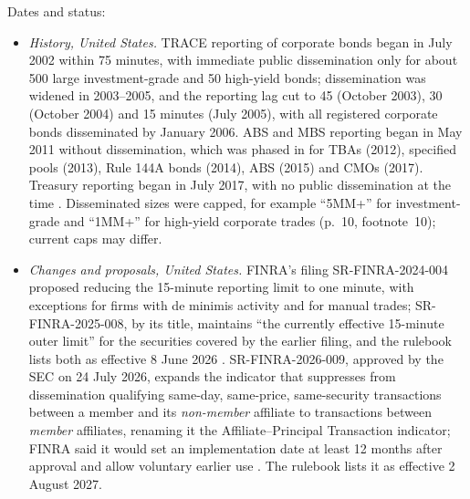 \begin{qfrule}
\begin{itemize}
\end{itemize}

 Dates and status:
\begin{itemize}
\item \emph{History, United States.} TRACE reporting of corporate bonds began in July 2002 within 75 minutes, with immediate public dissemination only for about 500 large investment-grade and 50 high-yield bonds; dissemination was widened in 2003--2005, and the reporting lag cut to 45 (October 2003), 30 (October 2004) and 15 minutes (July 2005), with all registered corporate bonds disseminated by January 2006. ABS and MBS reporting began in May 2011 without dissemination, which was phased in for TBAs (2012), specified pools (2013), Rule 144A bonds (2014), ABS (2015) and CMOs (2017). Treasury reporting began in July 2017, with no public dissemination at the time \citep[Table~2, p.~9]{wide-bsv-fi-survey}. Disseminated sizes were capped, for example ``5MM+'' for investment-grade and ``1MM+'' for high-yield corporate trades (p.~10, footnote~10); current caps may differ.
\item \emph{Changes and proposals, United States.} FINRA's filing SR-FINRA-2024-004 proposed reducing the 15-minute reporting limit to one minute, with exceptions for firms with de minimis activity and for manual trades; SR-FINRA-2025-008, by its title, maintains ``the currently effective 15-minute outer limit'' for the securities covered by the earlier filing, and the rulebook lists both as effective 8 June 2026 \citep[filing pages]{finra-sr-2024-004}. SR-FINRA-2026-009, approved by the SEC on 24 July 2026, expands the indicator that suppresses from dissemination qualifying same-day, same-price, same-security transactions between a member and its \emph{non-member} affiliate to transactions between \emph{member} affiliates, renaming it the Affiliate--Principal Transaction indicator; FINRA said it would set an implementation date at least 12 months after approval and allow voluntary earlier use \citep[pp.~47909--47911]{sec-34-105991}. The rulebook lists it as effective 2 August 2027.


\end{itemize}
\end{qfrule}
